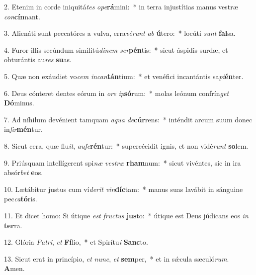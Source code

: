 2. Etenim in corde iniquitá\textit{tes} \textit{o}\textit{pe}\textbf{rá}mini:~*  in terra injustítias manus vestræ \textit{con}\textbf{cín}nant.\

3. Alienáti sunt peccatóres a vulva, erra\textit{vé}\textit{runt} \textit{ab} \textbf{ú}tero:~*  locúti \textit{sunt} \textbf{fal}sa.\

4. Furor illis secúndum similitú\textit{di}\textit{nem} \textit{ser}\textbf{pén}tis:~*  sicut áspidis surdæ, et obturántis au\textit{res} \textbf{su}as.\

5. Quæ non exáudiet vo\textit{cem} \textit{in}\textit{can}\textbf{tán}tium:~*  et venéfici incantántis sa\textit{pi}\textbf{én}ter.\

6. Deus cónteret dentes eórum in \textit{o}\textit{re} \textit{ip}\textbf{só}rum:~*  molas leónum confrín\textit{get} \textbf{Dó}minus.\

7. Ad níhilum devénient tamquam \textit{a}\textit{qua} \textit{de}\textbf{cúr}rens:~*  inténdit arcum suum donec in\textit{fir}\textbf{mén}tur.\

8. Sicut cera, quæ flu\textit{it}, \textit{au}\textit{fe}\textbf{rén}tur:~*  supercécidit ignis, et non vidé\textit{runt} \textbf{so}lem.\

9. Priúsquam intellígerent spi\textit{næ} \textit{ves}\textit{træ} \textbf{rham}num:~*  sicut vivéntes, sic in ira absór\textit{bet} \textbf{e}os.\

10. Lætábitur justus cum ví\textit{de}\textit{rit} \textit{vin}\textbf{díc}tam:~*  manus suas lavábit in sánguine pec\textit{ca}\textbf{tó}ris.\

11. Et dicet homo: Si útique \textit{est} \textit{fruc}\textit{tus} \textbf{jus}to:~*  útique est Deus júdicans eos \textit{in} \textbf{ter}ra.\

12. Glória \textit{Pa}\textit{tri}, \textit{et} \textbf{Fí}lio,~*  et Spirítu\textit{i} \textbf{Sanc}to.\

13. Sicut erat in princípio, \textit{et} \textit{nunc}, \textit{et} \textbf{sem}per,~*  et in sǽcula sæculó\textit{rum}. \textbf{A}men.\

